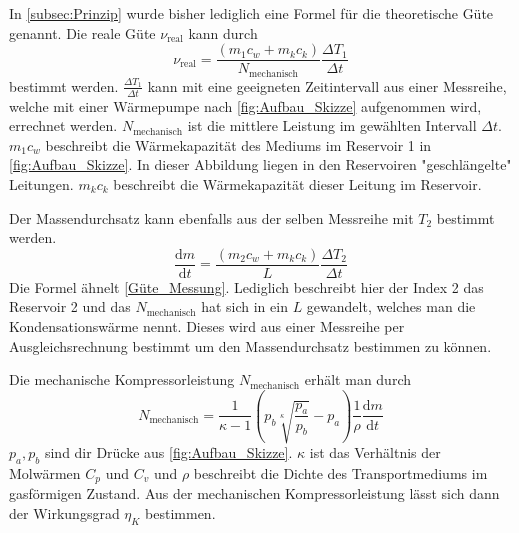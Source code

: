 In \autoref{subsec:Prinzip} wurde bisher lediglich eine Formel für die theoretische Güte genannt. Die reale Güte $\nu_{\text{real}}$ kann durch 
\begin{equation}
    \label{Güte_Messung}
    \nu_{\text{real}} = \frac{\left(m_1 c_w + m_k c_k\right)}{N_{\text{mechanisch}}}\frac{\Delta T_1}{\Delta t}
\end{equation}
bestimmt werden. $\frac{\Delta T_1}{\Delta t}$ kann mit eine geeigneten Zeitintervall aus einer Messreihe, welche mit einer Wärmepumpe nach \autoref{fig:Aufbau_Skizze} aufgenommen wird,
errechnet werden. $N_{\text{mechanisch}}$ ist die mittlere Leistung im gewählten Intervall $\Delta t$. $m_1c_w$ beschreibt die Wärmekapazität des Mediums im Reservoir 1 in \autoref{fig:Aufbau_Skizze}. In dieser Abbildung 
liegen in den Reservoiren "geschlängelte" Leitungen. $m_kc_k$ beschreibt die Wärmekapazität dieser Leitung im Reservoir. 


Der Massendurchsatz kann ebenfalls aus der selben Messreihe mit $T_2$ bestimmt werden. 
\begin{equation}
    \label{Massendurchsatz}
    \frac{\text{d}m}{\text{d}t} = \frac{\left(m_2 c_w + m_k c_k\right)}{L}\frac{\Delta T_2}{\Delta t}
\end{equation}
Die Formel ähnelt \autoref{Güte_Messung}. Lediglich beschreibt hier der Index 2 das Reservoir 2 und das $N_{\text{mechanisch}}$ hat sich in ein $L$ gewandelt, welches man die Kondensationswärme nennt.
Dieses wird aus einer Messreihe per Ausgleichsrechnung bestimmt um den Massendurchsatz bestimmen zu können.


Die mechanische Kompressorleistung $N_{\text{mechanisch}}$ erhält man durch
\begin{equation}
    \label{Massendurchsatz}
    N_{\text{mechanisch}} = \frac{1}{\kappa - 1}\left(p_b \sqrt[\kappa]{\frac{p_a}{p_b}} - p_a \right) \frac{1}{\rho} \frac{\text{d}m}{\text{d}t}
\end{equation}
$p_a, p_b$ sind dir Drücke aus \autoref{fig:Aufbau_Skizze}. $\kappa$ ist das Verhältnis der Molwärmen $C_p$ und $C_v$ und $\rho$ beschreibt die Dichte des Transportmediums im gasförmigen
Zustand. Aus der mechanischen Kompressorleistung lässt sich dann der Wirkungsgrad $\eta_K$ bestimmen.